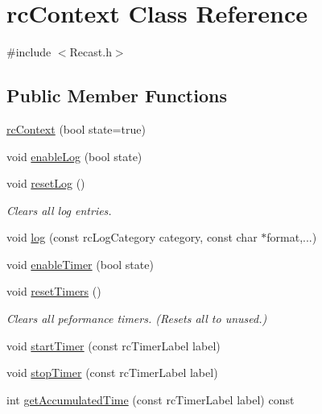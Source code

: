 \hypertarget{classrcContext}{}\section{rc\+Context Class Reference}
\label{classrcContext}


{\ttfamily \#include $<$Recast.\+h$>$}

\subsection*{Public Member Functions}
\begin{DoxyCompactItemize}
\item 
\hyperlink{classrcContext_ae405295998d6c1db0ceb60d0f64559bc}{rc\+Context} (bool state=true)
\item 
void \hyperlink{classrcContext_a03dcf9240dc69a7c329c15e32be12d8e}{enable\+Log} (bool state)
\item 
\mbox{\label{classrcContext_a68403737730ee112c523890a9fdc237d}} 
void \hyperlink{classrcContext_a68403737730ee112c523890a9fdc237d}{reset\+Log} ()
\begin{DoxyCompactList}\small\item\em Clears all log entries. \end{DoxyCompactList}\item 
void \hyperlink{classrcContext_ae3cc278477b1b923d03ea50e3ae96013}{log} (const rc\+Log\+Category category, const char $\ast$format,...)
\item 
void \hyperlink{classrcContext_aa4680430d751824f83634ac753df9669}{enable\+Timer} (bool state)
\item 
\mbox{\label{classrcContext_a2fcc58bb1e29bbb9a7dfb834efff4a6d}} 
void \hyperlink{classrcContext_a2fcc58bb1e29bbb9a7dfb834efff4a6d}{reset\+Timers} ()
\begin{DoxyCompactList}\small\item\em Clears all peformance timers. (Resets all to unused.) \end{DoxyCompactList}\item 
void \hyperlink{classrcContext_a3c8d3035e1046dd8907b10b7d9c8de57}{start\+Timer} (const rc\+Timer\+Label label)
\item 
void \hyperlink{classrcContext_a3f7042723b8d99d486575eb3d592af25}{stop\+Timer} (const rc\+Timer\+Label label)
\item 
int \hyperlink{classrcContext_a17e7b79afff2f042961698aa1c818c3d}{get\+Accumulated\+Time} (const rc\+Timer\+Label label) const

\end{DoxyCompactItemize}
